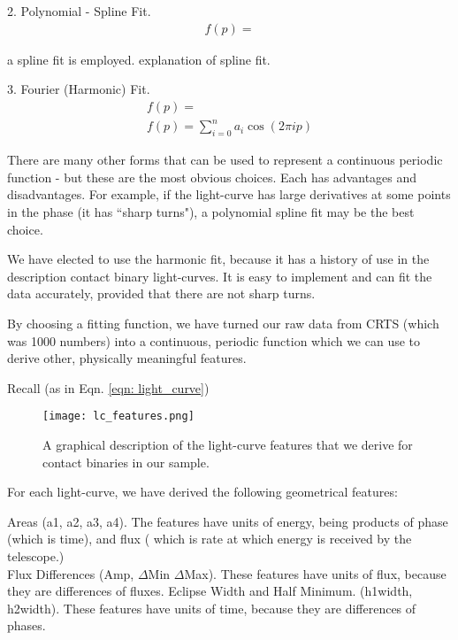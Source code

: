 \documentclass[12pt]{article} %
\numberwithin{equation}{section} %
\begin{document}
2. Polynomial - Spline Fit. \\

\begin{multline} \label{eqn: spline_fit} 
f(p) = 
\end{multline}

\citep{gettel2006catalog} a spline fit is employed. \citep{akerlof1994application} explanation of spline fit.

3. Fourier (Harmonic) Fit. \\

\begin{multline} \label{eqn: harmonic_fit} 
f(p) =  \\
f(p) = \sum_{i = 0}^{n} a_{i} \cos(2 \pi i p)
\end{multline}

There are many other forms that can be used to represent a continuous periodic function - but these are the most obvious choices. Each has advantages and disadvantages. For example, if the light-curve has large derivatives at some points in the phase (it has ``sharp turns"), a polynomial spline fit may be the best choice.

We have elected to use the harmonic fit, because it has a history of use in the description contact binary light-curves. It is easy to implement and can fit the data accurately, provided that there are not sharp turns.

By choosing a fitting function, we have turned our raw data from CRTS (which was 1000 numbers) into a continuous, periodic function which we can use to derive other, physically meaningful features.

Recall (as in Eqn. \ref{eqn: light_curve}) 

\begin{figure}[H]
\centering
\texttt{[image: lc\_features.png]}
\caption{A graphical description of the light-curve features that we derive for contact binaries in our sample.}
\label{fig: lc_features}
\end{figure}

For each light-curve, we have derived the following geometrical features:

Areas (a1, a2, a3, a4). The features have units of energy, being products of phase (which is time), and flux ( which is rate at which energy is received by the telescope.) \\
Flux Differences (Amp, $\Delta$Min $\Delta$Max). These features have units of flux, because they are differences of fluxes.
Eclipse Width and Half Minimum. (h1width, h2width). These features have units of time, because they are differences of phases.
\end{document}
